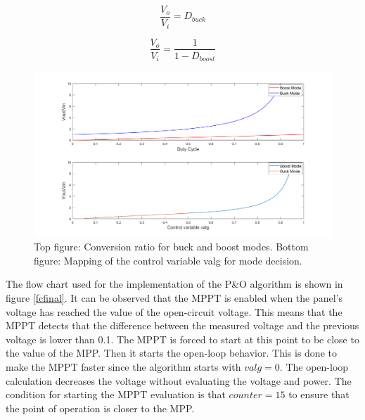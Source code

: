 \vspace{1cm}
\begin{minipage}{0.3\linewidth}
	\begin{equation}	\label{tfbuck}
	\frac{V_o}{V_i} = D_{buck}
	\end{equation}

\end{minipage}%
\begin{minipage}{0.5\linewidth}	
	\begin{equation}	\label{tfboost}
	\frac{V_o}{V_i}= \frac{1}{1-D_{boost}}
	\end{equation}

\end{minipage}

\begin{figure}[H]
	\begin{center}
		\includegraphics[width=1\textwidth]{../Pictures/decision_mode_operation}
		\caption{Top figure: Conversion ratio for buck and boost modes. Bottom figure: Mapping of the control variable valg for mode decision.}
		\label{fig:mappingtf} 
	\end{center}	
\end{figure}

The flow chart used for the implementation of the P\&O algorithm is shown in figure \ref{fcfinal}. It can be observed that the MPPT is enabled when the panel's voltage has reached the value of the open-circuit voltage. This means that the MPPT detects that the difference between the measured voltage and the previous voltage is lower than 0.1. The MPPT is forced to start at this point to be close to the value of the MPP. 
Then it starts the open-loop behavior. This is done to make the MPPT faster since the algorithm starts with $valg = 0$. The open-loop calculation decreases the voltage without evaluating the voltage and power. The condition for starting the MPPT evaluation is that $counter=15$ to ensure that the point of operation is closer to the MPP. 

